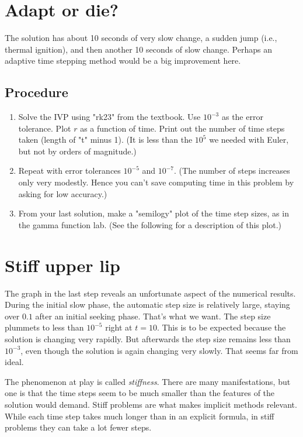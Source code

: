 \documentclass[11pt,twoside]{article}
\begin{document}
\section{Adapt or die?}

The solution has about 10 seconds of very slow change, a sudden jump (i.e., thermal ignition), and then another 10 seconds of slow change. Perhaps an adaptive time stepping method would be a big improvement here. 

\subsection*{Procedure}
\begin{enumerate}
  \item Solve the IVP using "rk23" from the textbook. Use $10^{-3}$ as the error tolerance. Plot $r$ as a function of time. Print out the number of time steps taken (length of "t" minus 1). (It is less than the $10^5$ we needed with Euler, but not by orders of magnitude.)
  \item Repeat with error tolerances $10^{-5}$ and $10^{-7}$. (The number of steps increases only very modestly. Hence you can't save computing time in this problem by asking for low accuracy.)
  \item From your last solution, make a "semilogy" plot of the time step sizes, as in the gamma function lab. (See the following for a description of this plot.)
\end{enumerate}

\section{Stiff upper lip}

The graph in the last step reveals an unfortunate aspect of the numerical results. During the initial slow phase, the automatic step size is relatively large, staying over $0.1$ after an initial seeking phase. That's what we want. The step size plummets to less than $10^{-5}$ right at $t=10$. This is to be expected because the solution is changing very rapidly. But afterwards the step size remains less than $10^{-3}$, even though the solution is again changing very slowly. That seems far from ideal. 

The phenomenon at play is called \textit{stiffness}. There are many manifestations, but one is that the time steps seem to be much smaller than the features of the solution would demand. Stiff problems are what makes implicit methods relevant. While each time step takes much longer than in an explicit formula, in stiff problems they can take a lot fewer steps. 
\end{document}
